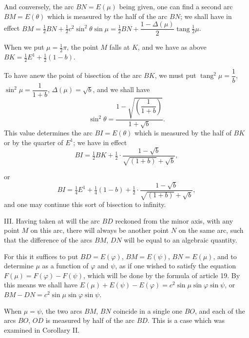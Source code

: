 \documentclass{article}
\begin{document}
And conversely, the arc $BN=E(\mu)$ being given, one can find a second arc $BM=E(\theta)$ which is measured by the half of the arc $BN$; we shall have in effect $BM=\frac{1}{2}BN+\frac{1}{2}c^{2}\sin^{2}\theta\sin\mu=\frac{1}{2}BN+\dfrac{1-\Delta(\mu)}{2}\operatorname{tang}\frac{1}{2}\mu$.

When we put $\mu=\frac{1}{2}\pi$, the point $M$ falls at $K$, and we have as above $BK=\frac{1}{2}E^{1}+\frac{1}{2}(1-b)$.

To have anew the point of bisection of the arc $BK$, we must put $\operatorname{tang}^{2}\mu=\dfrac{1}{b}$, $\sin^{2}\mu=\dfrac{1}{1+b}$, $\Delta(\mu)=\sqrt{b}$, and we shall have
\[ \sin^{2}\theta=\frac{1-\sqrt{\left(\dfrac{1}{1+b}\right)}}{1+\sqrt{b}}. \]
This value determines the arc $BI=E(\theta)$ which is measured by the half of $BK$ or by the quarter of $E^{1}$; we have in effect
\[ BI=\tfrac{1}{2}BK+\tfrac{1}{2}\cdot\frac{1-\sqrt{b}}{\sqrt{(1+b)}+\sqrt{b}}, \]

or
\[ BI=\tfrac{1}{4}E^{1}+\tfrac{1}{4}(1-b)+\tfrac{1}{2}\cdot\frac{1-\sqrt{b}}{\sqrt{(1+b)}+\sqrt{b}}, \]
and one may continue this sort of bisection to infinity.


III. Having taken at will the arc $BD$ reckoned from the minor axis, with any point $M$ on this arc, there will always be another point $N$ on the same arc, such that the difference of the arcs $BM$, $DN$ will be equal to an algebraic quantity.

For this it suffices to put $BD=E(\varphi)$, $BM=E(\psi)$, $BN=E(\mu)$, and to determine $\mu$ as a function of $\varphi$ and $\psi$, as if one wished to satisfy the equation $F(\mu)=F(\varphi)-F(\psi)$, which will be done by the formula of article 19. By this means we shall have $E(\mu)+E(\psi)-E(\varphi)=c^{2}\sin\mu\sin\varphi\sin\psi$, or $BM-DN=c^{2}\sin\mu\sin\varphi\sin\psi$.

When $\mu=\psi$, the two arcs $BM$, $BN$ coincide in a single one $BO$, and each of the arcs $BO$, $OD$ is measured by half of the arc $BD$. This is a case which was examined in Corollary II.

\end{document}

